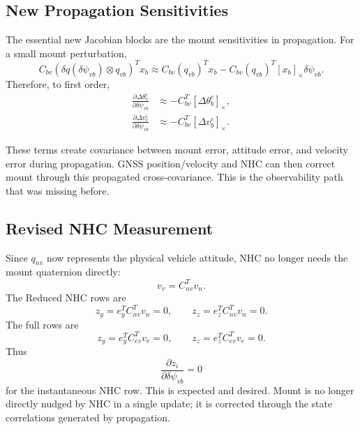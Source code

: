 \documentclass[11pt]{article}
\newcommand{\T}{^{T}}
\newcommand{\crossmat}[1]{\left[#1\right]_\times}
\newcommand{\dq}{\delta q}
\begin{document}
\subsection{New Propagation Sensitivities}

The essential new Jacobian blocks are the mount sensitivities in propagation.
For a small mount perturbation,
\begin{equation}
  C_{bv}(\dq(\delta\psi_{vb})\otimes q_{vb})\T x_b
  \approx
  C_{bv}(q_{vb})\T x_b
  - C_{bv}(q_{vb})\T \crossmat{x_b}\delta\psi_{vb}.
\end{equation}
Therefore, to first order,
\begin{align}
  \frac{\partial \Delta\theta_v^c}{\partial \delta\psi_{vb}}
    &\approx -C_{bv}\T\crossmat{\Delta\theta_b^c},\\
  \frac{\partial \Delta v_v^c}{\partial \delta\psi_{vb}}
    &\approx -C_{bv}\T\crossmat{\Delta v_b^c}.
\end{align}

These terms create covariance between mount error, attitude error, and velocity
error during propagation. GNSS position/velocity and NHC can then correct mount
through this propagated cross-covariance. This is the observability path that
was missing before.

\subsection{Revised NHC Measurement}

Since \(q_{nv}\) now represents the physical vehicle attitude, NHC no longer
needs the mount quaternion directly:
\begin{equation}
  v_v = C_{nv}\T v_n.
\end{equation}
The Reduced NHC rows are
\begin{equation}
  z_y=e_y\T C_{nv}\T v_n=0,\qquad
  z_z=e_z\T C_{nv}\T v_n=0.
\end{equation}
The full rows are
\begin{equation}
  z_y=e_y\T C_{ev}\T v_e=0,\qquad
  z_z=e_z\T C_{ev}\T v_e=0.
\end{equation}
Thus
\begin{equation}
  \frac{\partial z_i}{\partial\delta\psi_{vb}} = 0
\end{equation}
for the instantaneous NHC row. This is expected and desired. Mount is no
longer directly nudged by NHC in a single update; it is corrected through the
state correlations generated by propagation.
\end{document}
